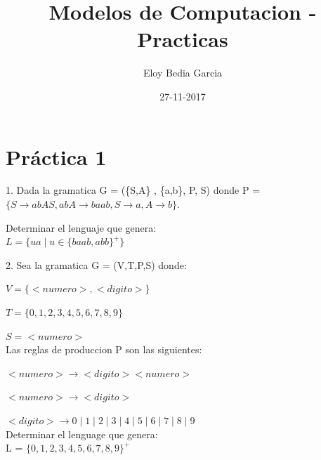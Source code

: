\documentclass{article}
\title{Modelos de Computacion - Practicas}
\date{27-11-2017}
\author{Eloy Bedia Garcia}
\begin{document}
  \maketitle

  \newpage

\section{Práctica 1}

\hspace{0,5cm}	1. Dada la gramatica G = (\{S,A\} , \{a,b\}, P, S) donde P =  $\{S  \rightarrow  abAS, abA  \rightarrow  baab, S  \rightarrow  a, A  \rightarrow  b \}$.

Determinar el lenguaje que genera:\\

\hspace{1cm}  $L = \{u a \mid u \in  \{baab,abb\}^+\}$ \\

\vspace{0,65cm}

2. Sea la gramatica G = (V,T,P,S) donde:

\hspace{1cm}	$V = \{<numero>,<digito>\}$

\hspace{1cm}	$T = \{0,1,2,3,4,5,6,7,8,9\}$

\hspace{1cm}	$S = <numero>$\\

\hspace{1cm}	Las reglas de produccion P son las siguientes:
	
\hspace{2cm}	$<numero> \rightarrow <digito><numero>$

\hspace{2cm}	$<numero> \rightarrow <digito>$

\hspace{2cm}	$<digito> \rightarrow 0\mid 1 \mid 2 \mid 3 \mid 4 \mid 5 \mid 6 \mid 7 \mid 8 \mid 9$\\

Determinar el lenguage que genera:\\

 \hspace{1cm}L = $\{ 0,1,2,3,4,5,6,7,8,9 \}^{+}$\\

\vspace{0,65cm}
\end{document}
